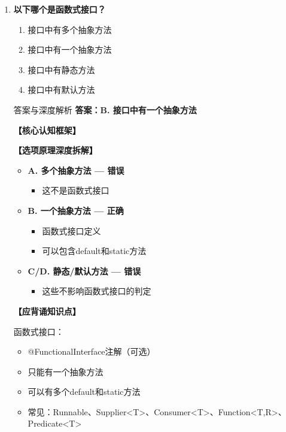 \documentclass[12pt, a4paper]{ctexart}
\begin{document}
\begin{enumerate}[label=\textbf{\arabic*.}]
	      \vspace{1em}

	\item \textbf{以下哪个是函数式接口？}
	      \begin{enumerate}[label=\Alph*.]
		      \item 接口中有多个抽象方法
		      \item 接口中有一个抽象方法
		      \item 接口中有静态方法
		      \item 接口中有默认方法
	      \end{enumerate}

	      \begin{bluebox}{答案与深度解析}
		      \textbf{答案：B. 接口中有一个抽象方法}

		      \textbf{【核心认知框架】}

		      \textbf{【选项原理深度拆解】}
					  \begin{itemize}[label={}, leftmargin=*, nosep]

		      
		      \item \textbf{A. 多个抽象方法 — 错误}
					  \begin{itemize}[label={}, nosep]
		      
			      \item 这不是函数式接口
		      

					  \end{itemize}
		      \item \textbf{B. 一个抽象方法 — 正确}
					  \begin{itemize}[label={}, nosep]
		      
			      \item 函数式接口定义
			      \item 可以包含default和static方法
		      

					  \end{itemize}
		      \item \textbf{C/D. 静态/默认方法 — 错误}
					  \begin{itemize}[label={}, nosep]
		      
			      \item 这些不影响函数式接口的判定
		      
		      

		      
					  \end{itemize}
					  \end{itemize}
\textbf{【应背诵知识点】}

		      函数式接口：
		      \begin{itemize}[label={}, nosep]
			      \item @FunctionalInterface注解（可选）
			      \item 只能有一个抽象方法
			      \item 可以有多个default和static方法
			      \item 常见：Runnable、Supplier<T>、Consumer<T>、Function<T,R>、Predicate<T>
		      \end{itemize}
	      \end{bluebox}


\end{enumerate}
\end{document}
